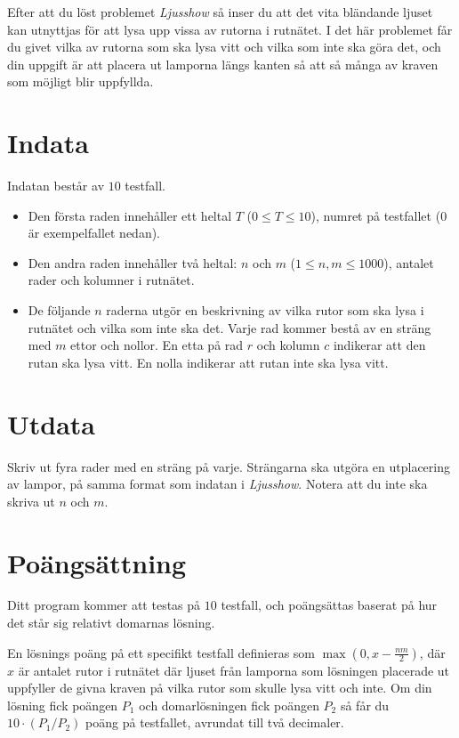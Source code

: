 Efter att du löst problemet \textit{Ljusshow} så inser du att det vita bländande ljuset kan
utnyttjas för att lysa upp vissa av rutorna i rutnätet. I det här problemet får du givet vilka av
rutorna som ska lysa vitt och vilka som inte ska göra det, och din uppgift är att placera ut lamporna
längs kanten så att så många av kraven som möjligt blir uppfyllda.


\section*{Indata}
Indatan består av $10$ testfall.

\begin{itemize}
  \item 
    Den första raden innehåller ett heltal $T$ ($0 \leq T \leq 10$), numret på testfallet ($0$ är exempelfallet nedan).
  \item
    Den andra raden innehåller två heltal: $n$ och $m$ ($1 \le n,m \le 1000$), antalet rader och kolumner i rutnätet.
  \item

    De följande $n$ raderna utgör en beskrivning av vilka rutor som ska lysa i rutnätet och vilka som inte ska det.
    Varje rad kommer bestå av en sträng med $m$ ettor och nollor. En etta på rad $r$ och kolumn $c$ indikerar att den
    rutan ska lysa vitt. En nolla indikerar att rutan inte ska lysa vitt.

\end{itemize}

\section*{Utdata}
Skriv ut fyra rader med en sträng på varje. Strängarna ska utgöra en utplacering av lampor, på samma format
som indatan i \textit{Ljusshow}. Notera att du inte ska skriva ut $n$ och $m$.

\section*{Poängsättning}
Ditt program kommer att testas på $10$ testfall, och poängsättas baserat på hur det står sig relativt domarnas lösning.

En lösnings poäng på ett specifikt testfall definieras som $\max(0, x - \frac{nm}{2})$, där $x$ är 
antalet rutor i rutnätet där ljuset från lamporna som lösningen placerade ut uppfyller de givna kraven
på vilka rutor som skulle lysa vitt och inte. Om din lösning fick poängen $P_1$ och domarlösningen fick
poängen $P_2$ så får du $10 \cdot (P_1 / P_2)$ poäng på testfallet, avrundat till två decimaler.

